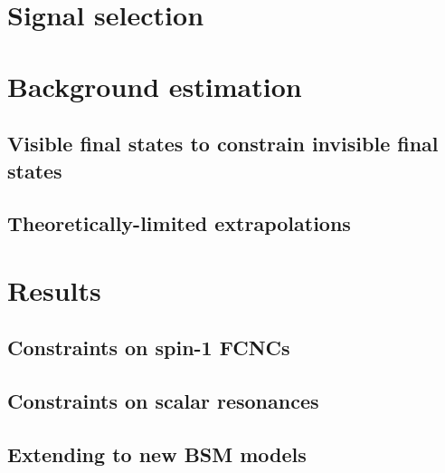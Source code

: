 \section{Signal selection}

\section{Background estimation}

\subsection{Visible final states to constrain invisible final states}

\subsection{Theoretically-limited extrapolations}

\section{Results}

\subsection{Constraints on spin-1 FCNCs}

\subsection{Constraints on scalar resonances}

\subsection{Extending to new BSM models}
